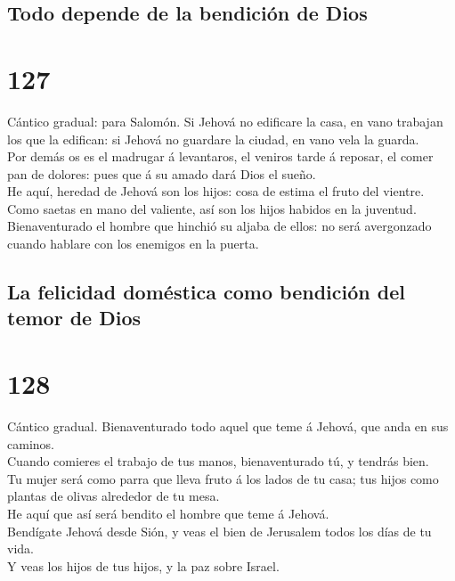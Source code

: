 \hypertarget{todo-depende-de-la-bendiciuxf3n-de-dios}{%
\subsection{Todo depende de la bendición de
Dios}\label{todo-depende-de-la-bendiciuxf3n-de-dios}}

\hypertarget{section-126}{%
\section{127}\label{section-126}}

 Cántico gradual: para Salomón. Si Jehová no edificare la
casa, en vano trabajan los que la edifican: si Jehová no guardare la
ciudad, en vano vela la guarda.\\
 Por demás os es el madrugar á levantaros, el veniros
tarde á reposar, el comer pan de dolores: pues que á su amado dará Dios
el sueño.\\
 He aquí, heredad de Jehová son los hijos: cosa de estima
el fruto del vientre.\\
 Como saetas en mano del valiente, así son los hijos
habidos en la juventud.\\
 Bienaventurado el hombre que hinchió su aljaba de ellos:
no será avergonzado cuando hablare con los enemigos en la puerta.

\hypertarget{la-felicidad-domuxe9stica-como-bendiciuxf3n-del-temor-de-dios}{%
\subsection{La felicidad doméstica como bendición del temor de
Dios}\label{la-felicidad-domuxe9stica-como-bendiciuxf3n-del-temor-de-dios}}

\hypertarget{section-127}{%
\section{128}\label{section-127}}

 Cántico gradual. Bienaventurado todo aquel que teme á
Jehová, que anda en sus caminos.\\
 Cuando comieres el trabajo de tus manos, bienaventurado
tú, y tendrás bien.\\
 Tu mujer será como parra que lleva fruto á los lados de
tu casa; tus hijos como plantas de olivas alrededor de tu mesa.\\
 He aquí que así será bendito el hombre que teme á
Jehová.\\
 Bendígate Jehová desde Sión, y veas el bien de Jerusalem
todos los días de tu vida.\\
 Y veas los hijos de tus hijos, y la paz sobre Israel.

